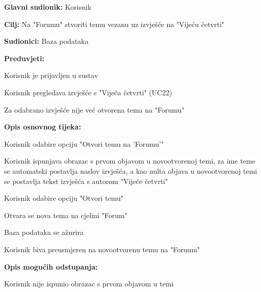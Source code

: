 						
						
					\noindent {}
					\begin{packed_item}
	
						\item \textbf{Glavni sudionik: }Korisnik
						\item  \textbf{Cilj:} Na "Forumu" stvoriti temu vezanu uz izvješće na "Vijeću četvrti"
						\item  \textbf{Sudionici:} Baza podataka
						\item  \textbf{Preduvjeti:}
						\item[] \begin{packed_enum}
							\item Korisnik je prijavljen u sustav
							\item Korisnik pregledava izvješće s "Vijeća četvrti" (UC22)
							\item Za odabrano izvješće nije već otvorena tema na "Forumu"								\end{packed_enum}
						\item  \textbf{Opis osnovnog tijeka:}
						
						\item[] \begin{packed_enum}
	
							\item Korisnik odabire opciju "Otvori temu na 'Forumu'"
							\item Korisnik ispunjava obrazac s prvom objavom u novootvorenoj temi, za ime teme se automatski postavlja naslov izvješća, a kao nulta objava u novootvorenoj temi se postavlja tekst izvješća s autorom "Vijeće četvrti"
							\item Korisnik odabire opciju "Otvori temu"
							\item Otvara se nova tema na cjelini "Forum"
							\item Baza podataka se ažurira
							\item Korisnik biva preusmjeren na novootvorenu temu na "Forumu"
							
						\end{packed_enum}	
						
						\item  \textbf{Opis mogućih odstupanja:}
						
						\item[] \begin{packed_item}
						\item[3.a] Korisnik nije ispunio obrazac s prvom objavom u temi
							\item[] \begin{packed_enum}
								

\end{packed_enum}
\end{packed_item}
\end{packed_item}
